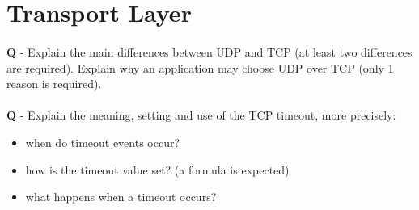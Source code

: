 \documentclass{llncs}
\newcounter{ques}
\renewcommand{\question}[1]{\paragraph{}\textbf{Q\theques} - #1\stepcounter{ques} }
\newcommand{\answer}[1]{}%
\begin{document}
\answer{
  \begin{itemize}
  \item DNS
  \item UDP
  \item It is a DNS query, asking for the IP of host with name ``client-cf.dropbox.com''.
  \item From a client as it has no answers.
  \item A DNS response might be sent to the client, containing the requested IP. 
  \end{itemize}
}

\newpage

\section{Transport Layer}


\question{Explain the main differences between UDP and TCP (at least
  two differences are required). Explain why an application may choose
  UDP over TCP (only 1 reason is required).}

\answer{ TCP provides reliable data transfer, connections, flow control and
  congestion control while UDP does not provide any of them. An
  application may choose UDP to avoid overheads related to reliable
  data transfers and to avoid throttling due to congestion control.}

\newpage

\question{Explain the meaning, setting and use of the TCP timeout, more precisely:
  \begin{itemize}
  \item when do timeout events occur? 
  \item how is the timeout value set? (a formula is expected)
  \item what happens when a timeout occurs?
  \end{itemize}
}

\answer{
  \begin{itemize}
  \item See slide 54. Timeout events occur when acknowledgements are not received in time.
  \item See slides 62 and 63. Timeout = EstimatedRTT + 4*DevRTT and EstimatedRTT=(1-$\alpha$)*EstimatedRTT+$\alpha$*SampleRTT.
  \item See slide 104. The slow start threshold is divided by 2, the congestion window is set to 1 MSS, the duplicate ACK count is set to 0, the missing segment is retransmitted.     
  \end{itemize}
}
\end{document}
